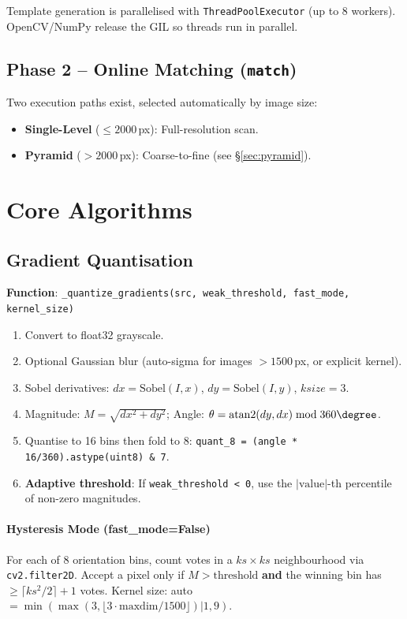 \documentclass[11pt,a4paper]{article}
\begin{document}
Template generation is parallelised with \texttt{ThreadPoolExecutor} (up to 8 workers). OpenCV/NumPy release the GIL so threads run in parallel.

\subsection{Phase 2 -- Online Matching (\texttt{match})}
Two execution paths exist, selected automatically by image size:
\begin{itemize}
\item \textbf{Single-Level} ($\leq 2000$\,px): Full-resolution scan.
\item \textbf{Pyramid} ($> 2000$\,px): Coarse-to-fine (see \S\ref{sec:pyramid}).
\end{itemize}

\section{Core Algorithms}

\subsection{Gradient Quantisation}\label{sec:quantize}
\textbf{Function}: \texttt{\_quantize\_gradients(src, weak\_threshold, fast\_mode, kernel\_size)}

\begin{enumerate}
\item Convert to float32 grayscale.
\item Optional Gaussian blur (auto-sigma for images $>1500$\,px, or explicit kernel).
\item Sobel derivatives: $dx = \text{Sobel}(I, x)$, $dy = \text{Sobel}(I, y)$, $ksize=3$.
\item Magnitude: $M = \sqrt{dx^2 + dy^2}$; Angle: $\theta = \text{atan2}(dy, dx) \bmod 360\degree$.
\item Quantise to 16 bins then fold to 8: \texttt{quant\_8 = (angle * 16/360).astype(uint8) \& 7}.
\item \textbf{Adaptive threshold}: If \texttt{weak\_threshold < 0}, use the $|\text{value}|$-th percentile of non-zero magnitudes.
\end{enumerate}

\paragraph{Hysteresis Mode (fast\_mode=False)}
For each of 8 orientation bins, count votes in a $ks \times ks$ neighbourhood via \texttt{cv2.filter2D}. Accept a pixel only if $M > \text{threshold}$ \textbf{and} the winning bin has $\geq \lceil ks^2/2 \rceil + 1$ votes. Kernel size: auto $= \min(\max(3, \lfloor 3 \cdot \text{maxdim}/1500 \rfloor) | 1, 9)$.
\end{document}
